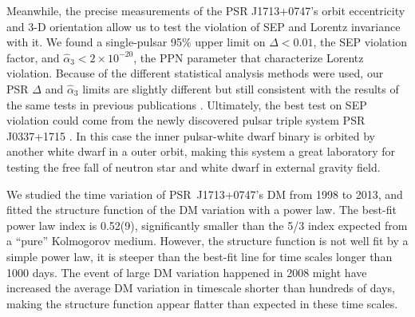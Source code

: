 
Meanwhile, the precise measurements of the PSR J1713+0747's orbit eccentricity and
3-D orientation allow us to test the violation of SEP and 
Lorentz invariance with it. We found a single-pulsar 95\% upper limit on 
$\Delta <0.01$, the SEP violation factor, and
$\hat{\alpha}_3<2\times10^{-20}$, the PPN parameter that characterize Lorentz
violation. 
Because of the different statistical analysis methods were used, our PSR
$\Delta$ and $\hat{\alpha}_3$ limits  are slightly
different but still consistent with the results of the same tests in previous publications 
\citep{wex00, sns+05, sfl+05, gsf+11}.
Ultimately, the best test on SEP violation could come from the newly
discovered pulsar triple system PSR J0337+1715 \citep{rsa+14}. In this case 
the inner pulsar-white dwarf binary is orbited by another white dwarf in a
outer orbit, making this system a great laboratory for testing
the free fall of neutron star and white dwarf in external gravity field.

We studied the time variation of PSR~J1713+0747's DM from 1998 to 2013, and
fitted the structure function of the DM variation with a power law.  
The best-fit power law index is 0.52(9), significantly smaller than the 5/3 
index expected from a ``pure'' Kolmogorov medium. However, the structure
function is not well fit by a simple power law, it is steeper than the best-fit
 line for time scales longer than 1000 days. The event of large DM variation happened in 2008  
might have increased the average DM variation in timescale shorter than
hundreds of days, making the structure function appear flatter than expected
in these time scales.



